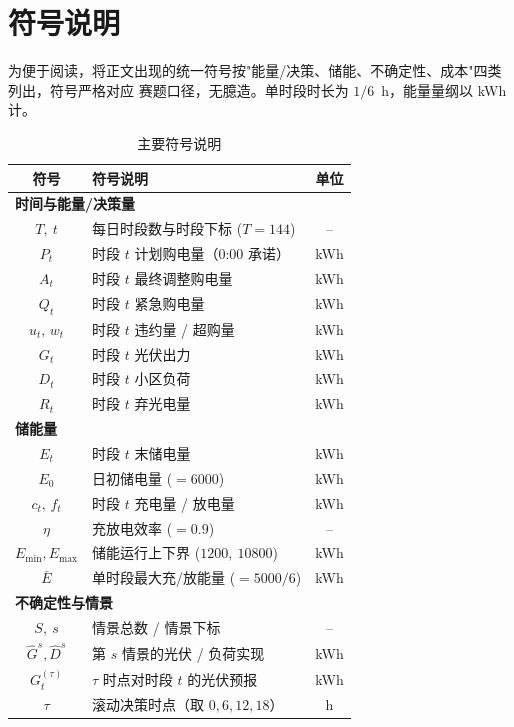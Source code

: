 \documentclass[withoutpreface]{cumcmthesis}
\begin{document}
\section{符号说明}
为便于阅读，将正文出现的统一符号按"能量/决策、储能、不确定性、成本"四类列出，符号严格对应
赛题口径，无臆造。单时段时长为 $1/6$~h，能量量纲以 kWh 计。
\begin{table}[H]
    \centering
    \caption{主要符号说明}\label{tab:symbol}
    \begin{tabular}{clc}
        \toprule[0.8pt]
        符号 & 符号说明 & 单位 \\
        \midrule[0.5pt]
        \multicolumn{3}{l}{\bf 时间与能量/决策量} \\
        $T,\ t$ & 每日时段数与时段下标 ($T=144$) & -- \\
        $P_t$ & 时段 $t$ 计划购电量（0:00 承诺） & kWh \\
        $A_t$ & 时段 $t$ 最终调整购电量 & kWh \\
        $Q_t$ & 时段 $t$ 紧急购电量 & kWh \\
        $u_t,\,w_t$ & 时段 $t$ 违约量 / 超购量 & kWh \\
        $G_t$ & 时段 $t$ 光伏出力 & kWh \\
        $D_t$ & 时段 $t$ 小区负荷 & kWh \\
        $R_t$ & 时段 $t$ 弃光电量 & kWh \\
        \midrule[0.5pt]
        \multicolumn{3}{l}{\bf 储能量} \\
        $E_t$ & 时段 $t$ 末储电量 & kWh \\
        $E_0$ & 日初储电量 ($=6000$) & kWh \\
        $c_t,\,f_t$ & 时段 $t$ 充电量 / 放电量 & kWh \\
        $\eta$ & 充放电效率 ($=0.9$) & -- \\
        $E_{\min},E_{\max}$ & 储能运行上下界 ($1200,\ 10800$) & kWh \\
        $\bar{E}$ & 单时段最大充/放能量 ($=5000/6$) & kWh \\
        \midrule[0.5pt]
        \multicolumn{3}{l}{\bf 不确定性与情景} \\
        $S,\ s$ & 情景总数 / 情景下标 & -- \\
        $\hat G^s,\hat D^s$ & 第 $s$ 情景的光伏 / 负荷实现 & kWh \\
        $G_t^{(\tau)}$ & $\tau$ 时点对时段 $t$ 的光伏预报 & kWh \\
        $\tau$ & 滚动决策时点（取 $0,6,12,18$） & h \\

\end{tabular}
\end{table}
\end{document}
